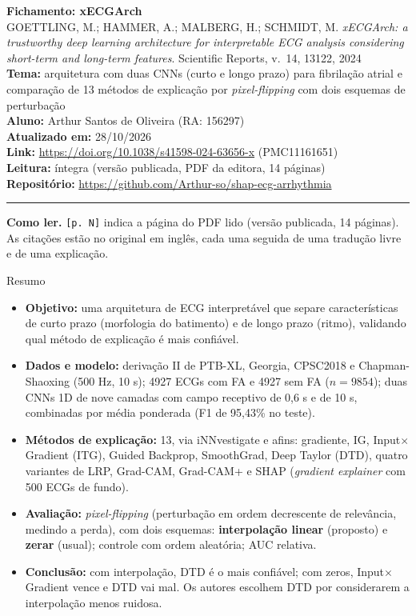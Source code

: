 \documentclass[11pt,a4paper]{article}
\begin{document}
\begin{center}
    {\LARGE \textbf{Fichamento: xECGArch}} \\[0.35em]
    {\large GOETTLING, M.; HAMMER, A.; MALBERG, H.; SCHMIDT, M. \textit{xECGArch: a trustworthy deep learning architecture for interpretable ECG analysis considering short-term and long-term features}. Scientific Reports, v.~14, 13122, 2024} \\[0.3em]
    \textbf{Tema:} arquitetura com duas CNNs (curto e longo prazo) para fibrilação atrial e comparação de 13 métodos de explicação por \textit{pixel-flipping} com dois esquemas de perturbação \\[0.2em]
    \textbf{Aluno:} Arthur Santos de Oliveira (RA: 156297) \\[0.2em]
    \textbf{Atualizado em:} 28/10/2026 \\[0.2em]
    \textbf{Link:} \url{https://doi.org/10.1038/s41598-024-63656-x} \quad (PMC11161651) \\[0.2em]
    \textbf{Leitura:} íntegra (versão publicada, PDF da editora, 14 páginas) \\[0.2em]
    \textbf{Repositório:} \url{https://github.com/Arthur-so/shap-ecg-arrhythmia}
\end{center}
\vspace{-0.5em}
\hrule
\vspace{0.8em}

\textbf{Como ler.} \texttt{[p. N]} indica a página do PDF lido (versão publicada, 14 páginas). As citações estão no original em inglês, cada uma seguida de uma tradução livre e de uma explicação.

\begin{infobox}[note]{Resumo}
\begin{itemize}
  \item \textbf{Objetivo:} uma arquitetura de ECG interpretável que separe características de curto prazo (morfologia do batimento) e de longo prazo (ritmo), validando qual método de explicação é mais confiável.
  \item \textbf{Dados e modelo:} derivação II de PTB-XL, Georgia, CPSC2018 e Chapman-Shaoxing (500 Hz, 10 s); 4927 ECGs com FA e 4927 sem FA ($n = 9854$); duas CNNs 1D de nove camadas com campo receptivo de 0,6 s e de 10 s, combinadas por média ponderada (F1 de 95,43\% no teste).
  \item \textbf{Métodos de explicação:} 13, via iNNvestigate e afins: gradiente, IG, Input$\times$Gradient (ITG), Guided Backprop, SmoothGrad, Deep Taylor (DTD), quatro variantes de LRP, Grad-CAM, Grad-CAM+ e SHAP (\textit{gradient explainer} com 500 ECGs de fundo).
  \item \textbf{Avaliação:} \textit{pixel-flipping} (perturbação em ordem decrescente de relevância, medindo a perda), com dois esquemas: \textbf{interpolação linear} (proposto) e \textbf{zerar} (usual); controle com ordem aleatória; AUC relativa.
  \item \textbf{Conclusão:} com interpolação, DTD é o mais confiável; com zeros, Input$\times$Gradient vence e DTD vai mal. Os autores escolhem DTD por considerarem a interpolação menos ruidosa.
\end{itemize}
\end{infobox}
\end{document}
